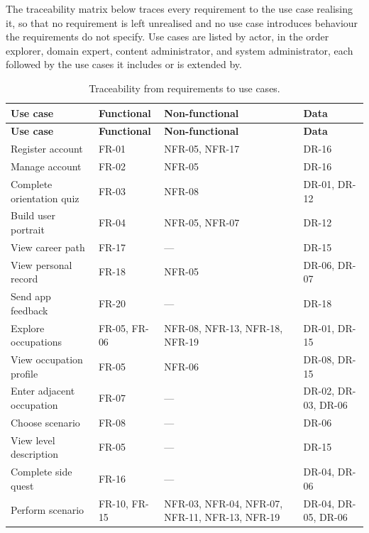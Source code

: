 The traceability matrix below traces every requirement to the use case realising it, so that no requirement is left unrealised and no use case introduces behaviour the requirements do not specify. Use cases are listed by actor, in the order explorer, domain expert, content administrator, and system administrator, each followed by the use cases it includes or is extended by.

{\small
\begin{longtable}{|>{\raggedright\arraybackslash}p{}|>{\raggedright\arraybackslash}p{}|>{\raggedright\arraybackslash}p{}|>{\raggedright\arraybackslash}p{}|}
\caption{Traceability from requirements to use cases.} \\
\hline
\textbf{Use case} & \textbf{Functional} & \textbf{Non-functional} & \textbf{Data} \\ \hline
\endfirsthead
\hline
\textbf{Use case} & \textbf{Functional} & \textbf{Non-functional} & \textbf{Data} \\ \hline
\endhead
Register account & FR-01 & NFR-05, NFR-17 & DR-16 \\ \hline
Manage account & FR-02 & NFR-05 & DR-16 \\ \hline
Complete orientation quiz & FR-03 & NFR-08 & DR-01, DR-12 \\ \hline
Build user portrait & FR-04 & NFR-05, NFR-07 & DR-12 \\ \hline
View career path & FR-17 & --- & DR-15 \\ \hline
View personal record & FR-18 & NFR-05 & DR-06, DR-07 \\ \hline
Send app feedback & FR-20 & --- & DR-18 \\ \hline
Explore occupations & FR-05, FR-06 & NFR-08, NFR-13, NFR-18, NFR-19 & DR-01, DR-15 \\ \hline
View occupation profile & FR-05 & NFR-06 & DR-08, DR-15 \\ \hline
Enter adjacent occupation & FR-07 & --- & DR-02, DR-03, DR-06 \\ \hline
Choose scenario & FR-08 & --- & DR-06 \\ \hline
View level description & FR-05 & --- & DR-15 \\ \hline
Complete side quest & FR-16 & --- & DR-04, DR-06 \\ \hline
Perform scenario & FR-10, FR-15 & NFR-03, NFR-04, NFR-07, NFR-11, NFR-13, NFR-19 & DR-04, DR-05, DR-06 \\ \hline

\end{longtable}}
